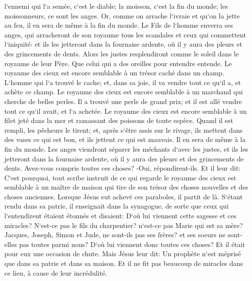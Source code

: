 \verse l`ennemi qui l`a semée, c`est le diable; la moisson, c`est la fin du monde; les moissonneurs, ce sont les anges. 
\verse Or, comme on arrache l`ivraie et qu`on la jette au feu, il en sera de même à la fin du monde. 
\verse Le Fils de l`homme enverra ses anges, qui arracheront de son royaume tous les scandales et ceux qui commettent l`iniquité: 
\verse et ils les jetteront dans la fournaise ardente, où il y aura des pleurs et des grincements de dents. 
\verse Alors les justes resplendiront comme le soleil dans le royaume de leur Père. Que celui qui a des oreilles pour entendre entende. 
\verse Le royaume des cieux est encore semblable à un trésor caché dans un champ. L`homme qui l`a trouvé le cache; et, dans sa joie, il va vendre tout ce qu`il a, et achète ce champ. 
\verse Le royaume des cieux est encore semblable à un marchand qui cherche de belles perles. 
\verse Il a trouvé une perle de grand prix; et il est allé vendre tout ce qu`il avait, et l`a achetée. 
\verse Le royaume des cieux est encore semblable à un filet jeté dans la mer et ramassant des poissons de toute espèce. 
\verse Quand il est rempli, les pêcheurs le tirent; et, après s`être assis sur le rivage, ils mettent dans des vases ce qui est bon, et ils jettent ce qui est mauvais. 
\verse Il en sera de même à la fin du monde. Les anges viendront séparer les méchants d`avec les justes, 
\verse et ils les jetteront dans la fournaise ardente, où il y aura des pleurs et des grincements de dents. 
\verse Avez-vous compris toutes ces choses? -Oui, répondirent-ils. 
\verse Et il leur dit: C`est pourquoi, tout scribe instruit de ce qui regarde le royaume des cieux est semblable à un maître de maison qui tire de son trésor des choses nouvelles et des choses anciennes. 
\verse Lorsque Jésus eut achevé ces paraboles, il partit de là. 
\verse S`étant rendu dans sa patrie, il enseignait dans la synagogue, de sorte que ceux qui l`entendirent étaient étonnés et disaient: D`où lui viennent cette sagesse et ces miracles? 
\verse N`est-ce pas le fils du charpentier? n`est-ce pas Marie qui est sa mère? Jacques, Joseph, Simon et Jude, ne sont-ils pas ses frères? 
\verse et ses soeurs ne sont-elles pas toutes parmi nous? D`où lui viennent donc toutes ces choses? 
\verse Et il était pour eux une occasion de chute. Mais Jésus leur dit: Un prophète n`est méprisé que dans sa patrie et dans sa maison. 
\verse Et il ne fit pas beaucoup de miracles dans ce lieu, à cause de leur incrédulité. 

\chapter{}

